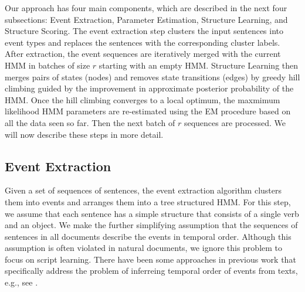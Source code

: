 \documentclass[letterpaper]{article}
\begin{document}



Our approach has four main components, which are described in the next four subsections: Event Extraction, Parameter Estimation, Structure Learning, and Structure Scoring. The event extraction step clusters the input sentences into event types and replaces the sentences with the corresponding cluster labels.  After extraction, the event sequences are iteratively merged with the current HMM in batches of size $r$ starting with an empty HMM. Structure Learning then merges pairs of states (nodes) and removes state transitions (edges) by greedy hill climbing guided by the improvement in approximate  
posterior probability of the HMM.  Once the hill climbing converges to a local optimum, the maxmimum likelihood HMM parameters are re-estimated using the EM procedure based on all the data seen so far. Then the next batch of $r$ sequences are processed.  We will now describe these steps in more detail.

\subsection{Event Extraction}
\vspace{-.05in}

Given a set of sequences of sentences, the event extraction algorithm clusters them into events and arranges them into a tree structured HMM. For this step, we assume that each sentence has a simple structure that consists of a single verb and an object. We make the further simplifying assumption that the sequences of sentences in all documents describe the events in temporal order. Although this assumption is often violated in natural documents, we ignore this problem to focus on script learning. There have been some approaches in previous work that specifically address the problem of inferreing temporal order of events from texts, e.g., see \cite{Raghavan:temporal}.

\end{document}
